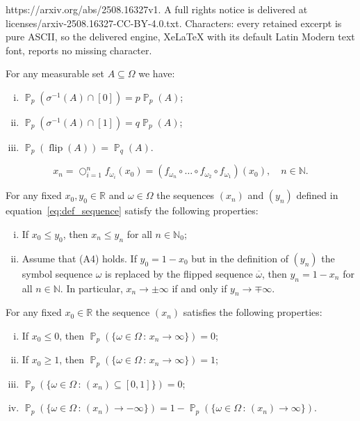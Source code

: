 \documentclass[10pt,a4paper]{amsart}
\DeclareMathOperator{\bigcomp}{\bigcirc}
\DeclareMathOperator{\prob}{\mathbb{P}}
\DeclareMathOperator{\rec}{flip}
\begin{document}
https://arxiv.org/abs/2508.16327v1. A full rights notice is delivered at licenses/arxiv-2508.16327-CC-BY-4.0.txt. Characters: every retained excerpt is pure ASCII, so the delivered engine, XeLaTeX with its default Latin Modern text font, reports no missing character.
\begin{lemma}
\label{lemma:sigma1}
For any measurable set $A \subseteq \Omega$ we have:
\begin{enumerate}[(i)]
\item $\prob_p(\sigma^{-1}(A) \cap [0]) = p\prob_p(A)$; 
\item $\prob_p(\sigma^{-1}(A) \cap [1]) = q\prob_p(A)$;
\item $\prob_p(\rec(A)) = \prob_q(A)$.
\end{enumerate}
\end{lemma}

\begin{equation}
\label{eq:def_sequence}
x_n = \bigcomp_{i=1}^n f_{\omega_i}(x_0) = (f_{\omega_n} \circ \dots \circ f_{\omega_2} \circ f_{\omega_1})(x_0), \quad n \in \mathbb{N}.
\end{equation}

\begin{lemma}
\label{lemma:properties2}
For any fixed $x_0, y_0 \in \mathbb{R}$ and $\omega \in \Omega$ the sequences $(x_n)$ and $(y_n)$ defined in equation~\eqref{eq:def_sequence} satisfy the following properties:
\begin{enumerate}[(i)]
\item If $x_0 \leq y_0$, then $x_n \leq y_n$ for all $n \in \mathbb{N}_0$;
\item Assume that (A4) holds. If $y_0 = 1-x_0$ but in the definition of $(y_n)$ the symbol sequence $\omega$ is replaced by the flipped sequence $\overline{\omega}$, then $y_n = 1-x_n$ for all $n \in \mathbb{N}$. In particular, $x_n \to \pm\infty$ if and only if $y_n \to \mp \infty$.
\end{enumerate}
\end{lemma}

\begin{lemma}
\label{lemma:properties3}
For any fixed $x_0 \in \mathbb{R}$ the sequence $(x_n)$ satisfies the following properties:
\begin{enumerate}[(i)]
\item If $x_0 \leq 0$, then $\prob_p(\{\omega \in \Omega \,:\, x_n \to \infty\}) = 0$;
\item If $x_0 \geq 1$, then $\prob_p(\{\omega \in \Omega \,:\, x_n \to \infty\}) = 1$;
\item $\prob_p(\{\omega \in \Omega \,:\, (x_n) \subseteq [0,1]\}) = 0$;
\item $\prob_p(\{\omega \in \Omega \,:\, (x_n) \to -\infty\}) = 1-\prob_p(\{\omega \in \Omega \,:\, (x_n) \to \infty\})$.
\end{enumerate}
\end{lemma}
\end{document}
